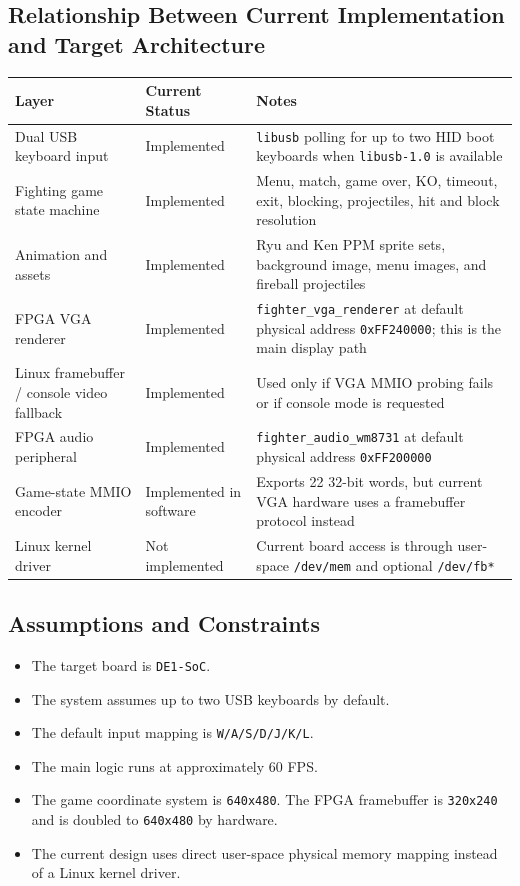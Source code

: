 \documentclass[12pt,a4paper]{article}
\begin{document}
\subsection{Relationship Between Current Implementation and Target Architecture}

\begin{longtable}{>{\raggedright\arraybackslash}p{} >{\raggedright\arraybackslash}p{} >{\raggedright\arraybackslash}p{}}
\toprule
Layer & Current Status & Notes \\
\midrule
\endhead
Dual USB keyboard input & Implemented & \texttt{libusb} polling for up to two HID boot keyboards when \texttt{libusb-1.0} is available \\
Fighting game state machine & Implemented & Menu, match, game over, KO, timeout, exit, blocking, projectiles, hit and block resolution \\
Animation and assets & Implemented & Ryu and Ken PPM sprite sets, background image, menu images, and fireball projectiles \\
FPGA VGA renderer & Implemented & \texttt{fighter\_vga\_renderer} at default physical address \texttt{0xFF240000}; this is the main display path \\
Linux framebuffer / console video fallback & Implemented & Used only if VGA MMIO probing fails or if console mode is requested \\
FPGA audio peripheral & Implemented & \texttt{fighter\_audio\_wm8731} at default physical address \texttt{0xFF200000} \\
Game-state MMIO encoder & Implemented in software & Exports 22 32-bit words, but current VGA hardware uses a framebuffer protocol instead \\
Linux kernel driver & Not implemented & Current board access is through user-space \texttt{/dev/mem} and optional \texttt{/dev/fb*} \\
\bottomrule
\end{longtable}

\subsection{Assumptions and Constraints}

\begin{itemize}
  \item The target board is \texttt{DE1-SoC}.
  \item The system assumes up to two USB keyboards by default.
  \item The default input mapping is \texttt{W/A/S/D/J/K/L}.
  \item The main logic runs at approximately 60 FPS.
  \item The game coordinate system is \texttt{640x480}. The FPGA framebuffer
  is \texttt{320x240} and is doubled to \texttt{640x480} by hardware.
  \item The current design uses direct user-space physical memory mapping
  instead of a Linux kernel driver.
\end{itemize}
\end{document}
